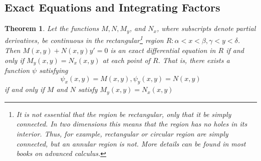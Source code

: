 \documentclass[10pt]{report}
\newtheorem{thm3}{Theorem}[subsection]
\begin{document}
\subsection{Exact Equations and Integrating Factors}
\begin{thm3}
Let the functions $M,N,M_y$, and $N_x$, where subscripts denote partial derivatives, be continuous in the rectangular\footnote{It is not essential that the region be rectangular, only that it be simply connected. In two dimensions this means that the region has no holes in its interior. Thus, for example, rectangular or circular region are simply connected, but an annular region is not. More details can be found in most books on advanced calculus.} region $R:\alpha < x <\beta, \gamma < y <\delta$. Then $M(x,y) + N(x,y)y' = 0$ is an exact differential equation in $R$ if and only if $M_y(x,y) = N_x(x,y)$ at each point of $R$. That is, there exists a function $\psi$ satisfying 
$$\psi_x(x,y) = M(x,y), \psi_y(x,y) = N(x,y)$$
if and only if $M$ and $N$ satisfy $M_y(x,y) = N_x(x,y)$
\end{thm3}
\end{document}

